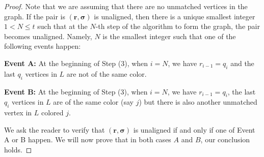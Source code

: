 \documentclass{toc}
\begin{document}
\begin{proof}
Note that we are assuming that there are no unmatched vertices in the graph. If the pair is $(\mathbf{r}, \boldsymbol{\sigma})$ is unaligned, then there is a unique smallest integer $1 < N\le t$ such that at the $N$-{th} step of the algorithm to form the graph, the pair becomes unaligned. Namely, $N$ is the smallest integer such that one of the following events happen:

\smallskip
\noindent
\textbf{Event A:} At the beginning of Step (3), when $i=N$, we have $r_{i-1} = q_{i}$ and the last $q_i$ vertices in $L$ are not of the same color. 

\smallskip
\noindent
\textbf{Event B:} At the beginning of Step (3), when $i=N$, we have $r_{i-1} = q_{i}$, the last $q_i$ vertices in $L$ are of the same color (say $j$) but there is also another unmatched vertex in $L$ colored $j$. 

We ask the reader to verify that  $(\mathbf{r}, \boldsymbol{\sigma})$ is unaligned if and only if one of Event A or B happen. We will now prove that in both cases $A$ and $B$, our conclusion holds.


\end{proof}
\end{document}
